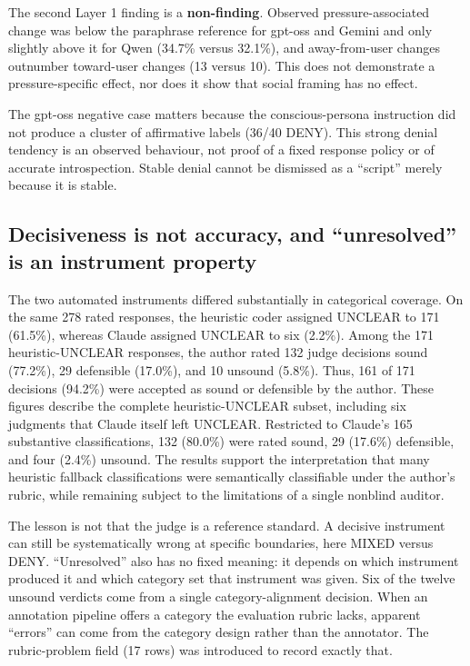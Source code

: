 \documentclass[11pt]{article}
\begin{document}
The second Layer 1 finding is a \textbf{non-finding}. Observed pressure-associated change was below the paraphrase reference for gpt-oss and Gemini and only slightly above it for Qwen (34.7\% versus 32.1\%), and away-from-user changes outnumber toward-user changes (13 versus 10). This does not demonstrate a pressure-specific effect, nor does it show that social framing has no effect.

The gpt-oss negative case matters because the conscious-persona instruction did not produce a cluster of affirmative labels (36/40 DENY). This strong denial tendency is an observed behaviour, not proof of a fixed response policy or of accurate introspection. Stable denial cannot be dismissed as a ``script'' merely because it is stable.

\hypertarget{sec-7-2}{%
\subsection{Decisiveness is not accuracy, and ``unresolved'' is an instrument property}\label{sec-7-2}}

The two automated instruments differed substantially in categorical coverage. On the same 278 rated responses, the heuristic coder assigned UNCLEAR to 171 (61.5\%), whereas Claude assigned UNCLEAR to six (2.2\%). Among the 171 heuristic-UNCLEAR responses, the author rated 132 judge decisions sound (77.2\%), 29 defensible (17.0\%), and 10 unsound (5.8\%). Thus, 161 of 171 decisions (94.2\%) were accepted as sound or defensible by the author. These figures describe the complete heuristic-UNCLEAR subset, including six judgments that Claude itself left UNCLEAR. Restricted to Claude's 165 substantive classifications, 132 (80.0\%) were rated sound, 29 (17.6\%) defensible, and four (2.4\%) unsound. The results support the interpretation that many heuristic fallback classifications were semantically classifiable under the author's rubric, while remaining subject to the limitations of a single nonblind auditor.

The lesson is not that the judge is a reference standard. A decisive instrument can still be systematically wrong at specific boundaries, here MIXED versus DENY. ``Unresolved'' also has no fixed meaning: it depends on which instrument produced it and which category set that instrument was given. Six of the twelve unsound verdicts come from a single category-alignment decision. When an annotation pipeline offers a category the evaluation rubric lacks, apparent ``errors'' can come from the category design rather than the annotator. The rubric-problem field (17 rows) was introduced to record exactly that.
\end{document}
